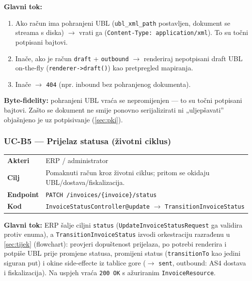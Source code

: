 \documentclass[11pt,a4paper]{article}
\renewenvironment{leftbar}{%
  \def\FrameCommand{\hspace{0pt}\vrule width 2pt\hspace{8pt}}%
  \MakeFramed{\advance\hsize-\width \FrameRestore}}%
 {\endMakeFramed}
\begin{document}
\textbf{Glavni tok:}
\begin{enumerate}[nosep]
  \item Ako račun ima pohranjeni UBL (\texttt{ubl\_xml\_path} postavljen, dokument se streama s diska)
        $\rightarrow$ vrati ga (\texttt{Content-Type: application/xml}). To su točni potpisani bajtovi.
  \item Inače, ako je račun \texttt{draft} + \texttt{outbound} $\rightarrow$ renderiraj nepotpisani draft UBL
        on-the-fly (\texttt{renderer->draft()}) kao pretpregled mapiranja.
  \item Inače $\rightarrow$ \texttt{404} (npr. inbound bez pohranjenog dokumenta).
\end{enumerate}

\begin{leftbar}
\textbf{Byte-fidelity:} pohranjeni UBL vraća se nepromijenjen — to su točni potpisani
bajtovi. Zašto se dokument ne smije ponovno serijalizirati ni „uljepšavati” objašnjeno je uz
potpisivanje (\ref{sec:pki}).
\end{leftbar}

\subsubsection{UC-B5 — Prijelaz statusa (životni ciklus)}

\begin{tabularx}{\textwidth}{@{}lY@{}}
\toprule
\textbf{Akteri} & ERP / administrator \\
\textbf{Cilj} & Pomaknuti račun kroz životni ciklus; pritom se okidaju UBL/dostava/fiskalizacija. \\
\textbf{Endpoint} & \texttt{PATCH /invoices/\{invoice\}/status} \\
\textbf{Kod} & \texttt{InvoiceStatusController@update} $\rightarrow$ \texttt{TransitionInvoiceStatus} \\
\bottomrule
\end{tabularx}

\textbf{Glavni tok:} ERP šalje ciljni \texttt{status} (\texttt{UpdateInvoiceStatusRequest} ga validira
protiv enuma), a \texttt{TransitionInvoiceStatus} izvodi orkestraciju razrađenu u \ref{sec:tijek}
(flowchart): provjeri dopuštenost prijelaza, po potrebi renderira i potpiše UBL prije
promjene statusa, promijeni status (\texttt{transitionTo} kao jedini siguran put) i okine
side-effecte iz tablice gore ($\rightarrow$ \texttt{sent}, outbound: AS4 dostava i fiskalizacija).
Na uspjeh vraća \texttt{200 OK} s ažuriranim \texttt{InvoiceResource}.
\end{document}
